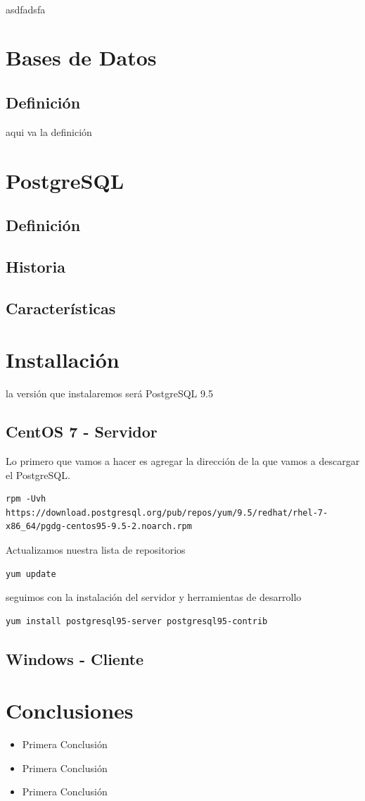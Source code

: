 \documentclass[10pt, a4paper]{article}
\begin{document}
\paragraph{}
asdfadsfa

\section{Bases de Datos}
\subsection{Definición}
aqui va la definición
\section{PostgreSQL}
\subsection{Definición}
\subsection{Historia}
\subsection{Características}

\section{Installación}
la versión que instalaremos será PostgreSQL 9.5
\subsection{CentOS 7 - Servidor}
Lo primero que vamos a hacer es agregar la dirección de la que vamos a descargar el PostgreSQL.

\begin{lstlisting}
rpm -Uvh https://download.postgresql.org/pub/repos/yum/9.5/redhat/rhel-7-x86_64/pgdg-centos95-9.5-2.noarch.rpm
\end{lstlisting}

Actualizamos nuestra lista de repositorios

\begin{lstlisting}
yum update
\end{lstlisting}

seguimos con la instalación del servidor y herramientas de desarrollo
\begin{lstlisting}
yum install postgresql95-server postgresql95-contrib
\end{lstlisting}


\subsection{Windows - Cliente}

\section{Conclusiones}
\begin{itemize}
\item Primera Conclusión
\item Primera Conclusión
\item Primera Conclusión
\end{itemize}
\end{document}

